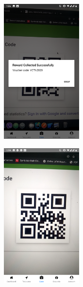 \documentclass[12pt, a4paper, oneside]{article}
\begin{document}
\begin{figure}[H]
\begin{subfigure}{.5\textwidth}
    \centering
    \includegraphics[width=0.45\textwidth]{test-evidences/reward/c.png}
    \caption{}
\end{subfigure}%
\begin{subfigure}{.5\textwidth}
    \centering
    \includegraphics[width=0.45\textwidth]{test-evidences/reward/d.png}
    \caption{}
\end{subfigure}


\end{figure}
\end{document}
